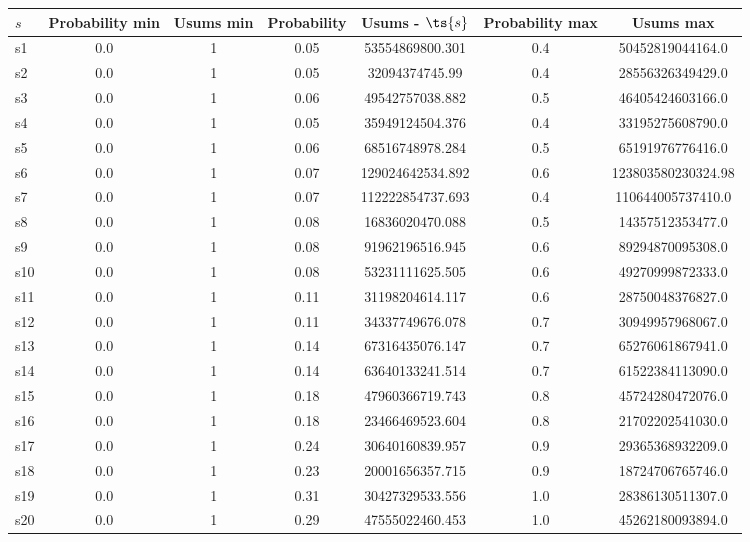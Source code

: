 \documentclass{article}
\begin{document}
\noindent\begin{tabular}{|l|c|c|c|c|c|c|}
\hline
$s$& Probability min & Usums min & Probability & Usums - $\ts{s}$ & Probability max & Usums max\\
\hline
s1 &0.0 & 1 & 0.05 & 53554869800.301 & 0.4 & 50452819044164.0\\
\hline
s2 &0.0 & 1 & 0.05 & 32094374745.99 & 0.4 & 28556326349429.0\\
\hline
s3 &0.0 & 1 & 0.06 & 49542757038.882 & 0.5 & 46405424603166.0\\
\hline
s4 &0.0 & 1 & 0.05 & 35949124504.376 & 0.4 & 33195275608790.0\\
\hline
s5 &0.0 & 1 & 0.06 & 68516748978.284 & 0.5 & 65191976776416.0\\
\hline
s6 &0.0 & 1 & 0.07 & 129024642534.892 & 0.6 & 123803580230324.98\\
\hline
s7 &0.0 & 1 & 0.07 & 112222854737.693 & 0.4 & 110644005737410.0\\
\hline
s8 &0.0 & 1 & 0.08 & 16836020470.088 & 0.5 & 14357512353477.0\\
\hline
s9 &0.0 & 1 & 0.08 & 91962196516.945 & 0.6 & 89294870095308.0\\
\hline
s10 &0.0 & 1 & 0.08 & 53231111625.505 & 0.6 & 49270999872333.0\\
\hline
s11 &0.0 & 1 & 0.11 & 31198204614.117 & 0.6 & 28750048376827.0\\
\hline
s12 &0.0 & 1 & 0.11 & 34337749676.078 & 0.7 & 30949957968067.0\\
\hline
s13 &0.0 & 1 & 0.14 & 67316435076.147 & 0.7 & 65276061867941.0\\
\hline
s14 &0.0 & 1 & 0.14 & 63640133241.514 & 0.7 & 61522384113090.0\\
\hline
s15 &0.0 & 1 & 0.18 & 47960366719.743 & 0.8 & 45724280472076.0\\
\hline
s16 &0.0 & 1 & 0.18 & 23466469523.604 & 0.8 & 21702202541030.0\\
\hline
s17 &0.0 & 1 & 0.24 & 30640160839.957 & 0.9 & 29365368932209.0\\
\hline
s18 &0.0 & 1 & 0.23 & 20001656357.715 & 0.9 & 18724706765746.0\\
\hline
s19 &0.0 & 1 & 0.31 & 30427329533.556 & 1.0 & 28386130511307.0\\
\hline
s20 &0.0 & 1 & 0.29 & 47555022460.453 & 1.0 & 45262180093894.0\\
\hline
\end{tabular}\\
\end{document}
